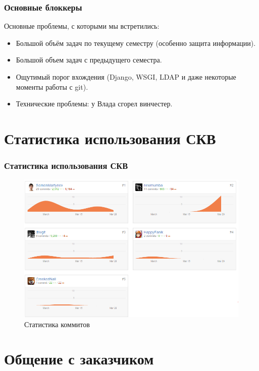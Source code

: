 \documentclass{beamer}
\newlength{\wideitemsep}
\let\olditem\item
\renewcommand{\item}{\setlength{\itemsep}{\wideitemsep}\olditem}
\begin{document}

\begin{frame}
\frametitle{Основные блоккеры}

Основные проблемы, с которыми мы встретились:
\begin{itemize}
\item Большой объём задач по текущему семестру (особенно защита информации).
\item Большой объем задач с предыдущего семестра.
\item Ощутимый порог вхождения (Django, WSGI, LDAP и даже некоторые моменты работы с git).
\item Технические проблемы: у Влада сгорел винчестер.
\end{itemize}


\end{frame}

\section{Статистика использования СКВ}

\begin{frame}
\frametitle{Статистика использования СКВ}

\begin{figure}
\includegraphics[scale=0.5]{res/r2_statistic}
\caption{Статистика коммитов}
\end{figure}


\end{frame}

\section{Общение с заказчиком}
\end{document}

